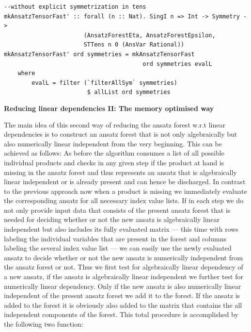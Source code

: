 \documentclass[a4paper,12pt, DIV=14, BCOR=5mm, twoside, headsepline]{scrbook}
\begin{document}
\begin{samepage}
\begin{verbatim}
--without explicit symmetrization in tens
mkAnsatzTensorFast' :: forall (n :: Nat). SingI n => Int -> Symmetry ->
                       (AnsatzForestEta, AnsatzForestEpsilon,
                       STTens n 0 (AnsVar Rational))
mkAnsatzTensorFast' ord symmetries = mkAnsatzTensorFast
                                        ord symmetries evalL
    where
        evalL = filter (`filterAllSym` symmetries) 
                        $ allList ord symmetries
\end{verbatim} 
\end{samepage}

\noindent \textbf{Reducing linear dependencies II:  The memory optimised way}

The main idea of this second way of reducing the ansatz forest w.r.t linear dependencies is to construct an ansatz forest that is not only algebraically but also numerically linear independent from the very beginning. This can be achieved as follows: As before the algorithm consumes a list of all possible individual products and checks in any given step if the product at hand is missing in the ansatz forest and thus represents an ansatz that is algebraically linear independent or is already present and can hence be discharged. In contrast to the previous approach now when a product is missing we immediately evaluate the corresponding ansatz for all necessary index value lists. If in each step we do not only provide input data that consists of the present ansatz forest that is needed for deciding whether or not the new ansatz is algebraically linear independent but also includes its fully evaluated matrix --- this time with rows labeling the individual variables that are present in the forest and columns labeling the several index value list ---
%
%
we can easily use the newly evaluated ansatz to decide whether or not the new ansatz is numerically independent from the ansatz forest or not. Thus we first test for algebraically linear dependency of a new ansatz, if the ansatz is algebraically linear independent we further test for numerically linear dependency. Only if the new ansatz is also numerically linear independent of the present ansatz forest we add it to the forest. If the ansatz is added to the forest it is obviously also added to the matrix that contains the all independent components of the forest. This total procedure is accomplished by the following two function:
\end{document}
